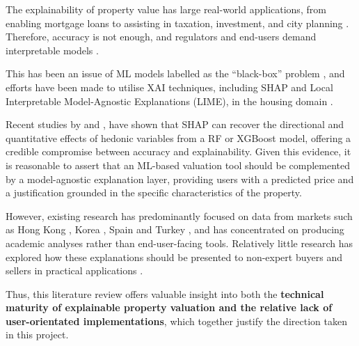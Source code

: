 The explainability of property value has large real-world applications, from enabling mortgage loans to assisting in taxation, investment, and city planning \parencite{Iban2022}. Therefore, accuracy is not enough, and regulators and end-users demand interpretable models \parencite{Lorenz2023}. 

This has been an issue of ML models labelled as the ``black-box'' problem \parencite{Adadi2018}, and efforts have been made to utilise XAI techniques, including SHAP and Local Interpretable Model-Agnostic Explanations (LIME), in the housing domain \parencite{Lundberg2017} \parencite{Ribeiro2016}.

Recent studies by \textcite{Rico-Juan2021} and \textcite{Iban2022}, have shown that SHAP can recover the directional and quantitative effects of hedonic variables from a RF or XGBoost model, offering a credible compromise between accuracy and explainability. Given this evidence, it is reasonable to assert that an ML-based valuation tool should be complemented by a model-agnostic explanation layer, providing users with a predicted price and a justification grounded in the specific characteristics of the property. 

However, existing research has predominantly focused on data from markets such as Hong Kong \parencite{Ho2020}, Korea \parencite{Kim2025}, Spain \parencite{Rico-Juan2021} and Turkey \parencite{Iban2022}, and has concentrated on producing academic analyses rather than end-user-facing tools. Relatively little research has explored how these explanations should be presented to non-expert buyers and sellers in practical applications \parencite{Bauer2023}. 

Thus, this literature review offers valuable insight into both the \textbf{technical maturity of explainable property valuation and the relative lack of user-orientated implementations}, which together justify the direction taken in this project.
